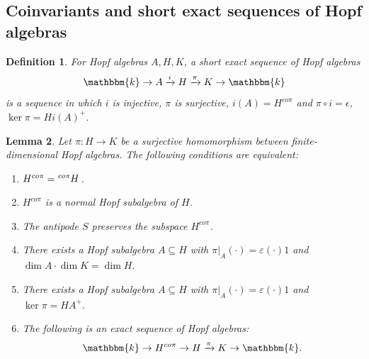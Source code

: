 \documentclass{amsart}
\theoremstyle{plain}%
\newtheorem{lemma}{Lemma}[subsection]
\newtheorem{definition}[lemma]{Definition}
\theoremstyle{remark}
\newcommand{\1}{\mathbbm{1}}
\newcommand{\kk}{\mathbbm{k}}
\newcommand{\eps}{\epsilon}
\newcommand{\prescr}[2]{\tensor*[^{#1}]{#2}{}}
\begin{document}
\subsection{Coinvariants and short exact sequences of Hopf algebras}
\begin{definition}
    For Hopf algebras $A,H,K$, a short exact sequence of Hopf algebras
    $$
        \kk\to A\xrightarrow{i}H\xrightarrow{\pi} K\to \kk
    $$
    is a sequence in which $i$ is injective, $\pi$ is surjective, $i(A) = H^{co \pi}$ and $\pi\circ i = \eps$, $\ker \pi = Hi(A)^+$.
\end{definition}


\begin{lemma}\label{lem:normal_equiv_cond}
    Let $\pi:H\to K$ be a surjective homomorphism between finite-dimensional Hopf algebras. The following conditions are equivalent:
    \begin{enumerate}
        \item $H^{co \pi} = \prescr{co\pi}{H}$. 
        \item $H^{co \pi}$ is a normal Hopf subalgebra of $H$. 
        \item The antipode $S$ preserves the subspace $H^{co \pi}$. 
       \item There exists a Hopf subalgebra $A\subseteq H$ with $\pi|_A(\cdot)=\varepsilon(\cdot)1$ and  $\dim A\cdot\dim K=\dim H$.
        \item There exists a Hopf subalgebra $A\subseteq H$ with $\pi|_A(\cdot)=\varepsilon(\cdot)1$ and  $\ker \pi = HA^+$.
        \item The following is an exact sequence of Hopf algebras:
        $$
            \kk \to H^{co \pi}\to H\xrightarrow{\pi} K\to \kk.
        $$ 
      
    \end{enumerate}    
\end{lemma}
\end{document}
